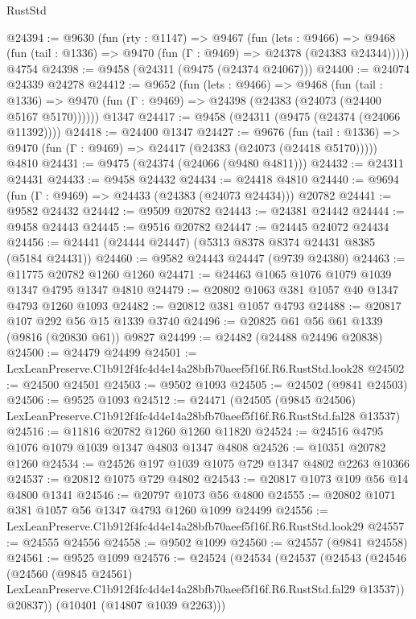 \begin{lexlean}{RustStd}
\begin{coremodule}
@24394 := @9630
    (fun (rty : @1147) =>
    @9467
      (fun (lets : @9466) =>
      @9468 (fun (tail : @1336) => @9470 (fun (Γ : @9469) => @24378 (@24383 @24344)))))
    @4754
@24398 := @9458 (@24311 (@9475 (@24374 @24067)))
@24400 := @24074 @24339 @24278
@24412 := @9652
    (fun (lets : @9466) =>
    @9468
      (fun (tail : @1336) =>
      @9470 (fun (Γ : @9469) => @24398 (@24383 (@24073 (@24400 @5167 @5170))))))
    @1347
@24417 := @9458 (@24311 (@9475 (@24374 (@24066 @11392))))
@24418 := @24400 @1347
@24427 := @9676
    (fun (tail : @1336) => @9470 (fun (Γ : @9469) => @24417 (@24383 (@24073 (@24418 @5170)))))
    @4810
@24431 := @9475 (@24374 (@24066 (@9480 @4811)))
@24432 := @24311 @24431
@24433 := @9458 @24432
@24434 := @24418 @4810
@24440 := @9694 (fun (Γ : @9469) => @24433 (@24383 (@24073 @24434))) @20782
@24441 := @9582 @24432
@24442 := @9509 @20782
@24443 := @24381 @24442
@24444 := @9458 @24443
@24445 := @9516 @20782
@24447 := @24445 @24072 @24434
@24456 := @24441 (@24444 @24447) (@5313 @8378 @8374 @24431 @8385 (@5184 @24431))
@24460 := @9582 @24443 @24447 (@9739 @24380)
@24463 := @11775 @20782 @1260 @1260
@24471 := @24463 @1065 @1076 @1079 @1039 @1347 @4795 @1347 @4810
@24479 := @20802 @1063 @381 @1057 @40 @1347 @4793 @1260 @1093
@24482 := @20812 @381 @1057 @4793
@24488 := @20817 @107 @292 @56 @15 @1339 @3740
@24496 := @20825 @61 @56 @61 @1339 (@9816 (@20830 @61)) @9827
@24499 := @24482 (@24488 @24496 @20838)
@24500 := @24479 @24499
@24501 := LexLeanPreserve.C1b912f4fc4d4e14a28bfb70aeef5f16f.R6.RustStd.look28
@24502 := @24500 @24501
@24503 := @9502 @1093
@24505 := @24502 (@9841 @24503)
@24506 := @9525 @1093
@24512 := @24471
    (@24505
      (@9845 @24506)
      LexLeanPreserve.C1b912f4fc4d4e14a28bfb70aeef5f16f.R6.RustStd.fal28
      @13537)
@24516 := @11816 @20782 @1260 @1260 @11820
@24524 := @24516 @4795 @1076 @1079 @1039 @1347 @4803 @1347 @4808
@24526 := @10351 @20782 @1260
@24534 := @24526 @197 @1039 @1075 @729 @1347 @4802 @2263 @10366
@24537 := @20812 @1075 @729 @4802
@24543 := @20817 @1073 @109 @56 @14 @4800 @1341
@24546 := @20797 @1073 @56 @4800
@24555 := @20802 @1071 @381 @1057 @56 @1347 @4793 @1260 @1099 @24499
@24556 := LexLeanPreserve.C1b912f4fc4d4e14a28bfb70aeef5f16f.R6.RustStd.look29
@24557 := @24555 @24556
@24558 := @9502 @1099
@24560 := @24557 (@9841 @24558)
@24561 := @9525 @1099
@24576 := @24524
    (@24534
      (@24537
        (@24543
          (@24546
            (@24560
              (@9845 @24561)
              LexLeanPreserve.C1b912f4fc4d4e14a28bfb70aeef5f16f.R6.RustStd.fal29
              @13537))
          @20837))
      (@10401 (@14807 @1039 @2263)))

\end{coremodule}
\end{lexlean}
